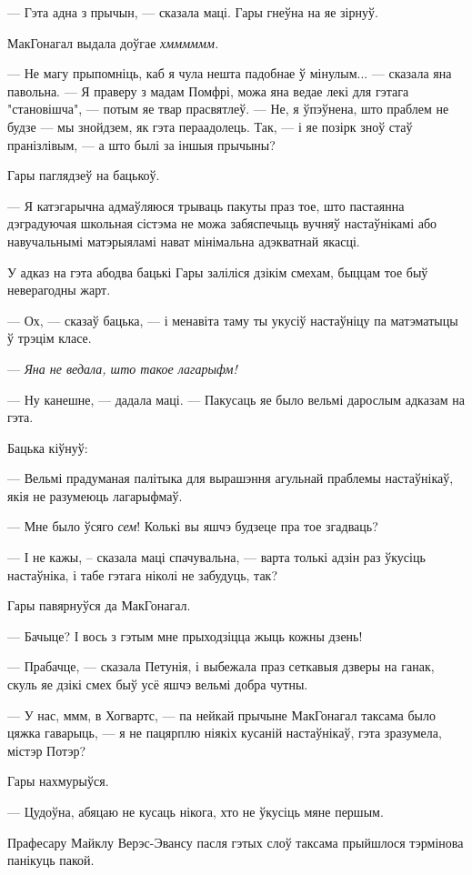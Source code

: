 --- Гэта адна з прычын, --- сказала маці. Гары гнеўна на яе зірнуў.

МакГонагал выдала доўгае \emph{хмммммм.}

--- Не магу прыпомніць, каб я чула нешта падобнае ў мінулым... --- сказала яна павольна. --- Я
праверу з мадам Помфрі, можа яна ведае лекі для гэтага "становішча", --- потым яе твар прасвятлеў.
--- Не, я ўпэўнена, што праблем не будзе --- мы знойдзем, як гэта пераадолець. Так, ---
і яе позірк зноў стаў пранізлівым, --- а што былі за іншыя прычыны?

Гары паглядзеў на бацькоў.

--- Я катэгарычна адмаўляюся трываць пакуты праз тое, што пастаянна дэградуючая школьная сістэма
не можа забяспечыць вучняў настаўнікамі або навучальнымі матэрыяламі нават мінімальна адэкватнай
якасці.

У адказ на гэта абодва бацькі Гары заліліся дзікім смехам, быццам тое быў неверагодны жарт.

--- Ох, --- сказаў бацька, --- і менавіта таму ты укусіў настаўніцу па матэматыцы ў трэцім класе.

--- \emph{Яна не ведала, што такое лагарыфм!}

--- Ну канешне, --- дадала маці. --- Пакусаць яе было вельмі дарослым адказам на гэта.

Бацька кіўнуў:

--- Вельмі прадуманая палітыка для вырашэння агульнай праблемы настаўнікаў, якія не разумеюць лагарыфмаў.

--- Мне было ўсяго \emph{сем}! Колькі вы яшчэ будзеце пра тое згадваць?

--- І не кажы, -- сказала маці спачувальна, --- варта толькі адзін раз ўкусіць настаўніка, і табе
гэтага ніколі не забудуць, так?

Гары павярнуўся да МакГонагал.

--- Бачыце? І вось з гэтым мне прыходзіцца жыць кожны дзень!

--- Прабачце, --- сказала Петунія, і выбежала праз сеткавыя дзверы на ганак, скуль яе дзікі
смех быў усё яшчэ вельмі добра чутны.

--- У нас, ммм, в Хогвартс, --- па нейкай прычыне МакГонагал таксама было цяжка гаварыць, ---
я не пацярплю ніякіх кусаній настаўнікаў, гэта зразумела, містэр Потэр?

Гары нахмурыўся.

--- Цудоўна, абяцаю не кусаць нікога, хто не ўкусіць мяне першым.

Прафесару Майклу Верэс-Эвансу пасля гэтых слоў таксама прыйшлося тэрмінова панікуць пакой.


